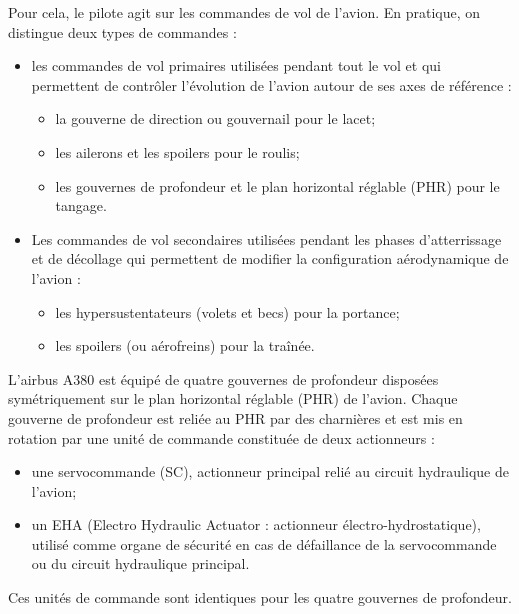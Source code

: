 \documentclass[11pt,oneside]{article}
\begin{document}
{\vspace{.5cm}


Pour cela, le pilote agit sur les commandes de vol de l'avion. En pratique, on distingue deux types de commandes : 
\begin{itemize}
\item les commandes de vol primaires utilisées pendant tout le vol et qui permettent de contrôler l'évolution de l'avion autour de ses axes de référence :
\begin{itemize}
\item la gouverne de direction ou gouvernail pour le lacet;
\item les ailerons et les spoilers pour le roulis; 
\item les gouvernes de profondeur et le plan horizontal réglable (PHR) pour le tangage. 
\end{itemize}
\item Les commandes de vol secondaires utilisées pendant les phases d'atterrissage et de décollage qui permettent de modifier la configuration aérodynamique de l'avion :
\begin{itemize}
\item les hypersustentateurs (volets et becs) pour la portance;
\item les spoilers (ou aérofreins) pour la traînée.
\end{itemize}
\end{itemize}

L'airbus A380 est équipé de quatre gouvernes de profondeur disposées symétriquement sur le plan horizontal réglable (PHR) de l'avion. Chaque gouverne de profondeur est reliée au PHR par des charnières et est mis en rotation par une unité de commande constituée de deux actionneurs :
\begin{itemize}
\item une servocommande (SC), actionneur principal relié au circuit hydraulique de l'avion;
\item un EHA (Electro Hydraulic Actuator : actionneur électro-hydrostatique), utilisé comme organe de sécurité en cas de défaillance de la servocommande ou du circuit hydraulique principal.
\end{itemize}

Ces unités de commande sont identiques pour les quatre gouvernes de profondeur.


}
\end{document}
